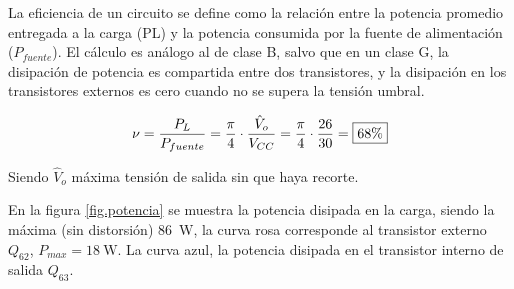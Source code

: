 
La eficiencia de un circuito se define como la relación entre la potencia promedio entregada a la carga (PL) y la potencia consumida por la fuente de alimentación ($P_{fuente}$). El cálculo es análogo al de clase B, salvo que en un clase G, la disipación de potencia es compartida entre dos transistores, y la disipación en los transistores externos es cero cuando no se supera la tensión umbral.

\begin{equation}
	\centering
	\nu = \frac{P_L}{P_{fuente}} = \frac{\pi}{4} \cdot \frac{\hat{V}_o}{V_{CC}} = \frac{\pi}{4} \cdot \frac{26}{30}= \boxed{68\%}
\end{equation}

Siendo $ \hat{V}_o$ máxima tensión de salida sin que haya recorte.


En la figura \ref{fig.potencia} se muestra la potencia disipada en la carga, siendo la máxima (sin distorsión) \SI{86}{\watt}, la curva rosa corresponde al transistor externo $Q_{62}$, $P_{max} = \SI{18}{\watt}$. La curva azul, la potencia disipada en el transistor interno de salida $Q_{63}$.



